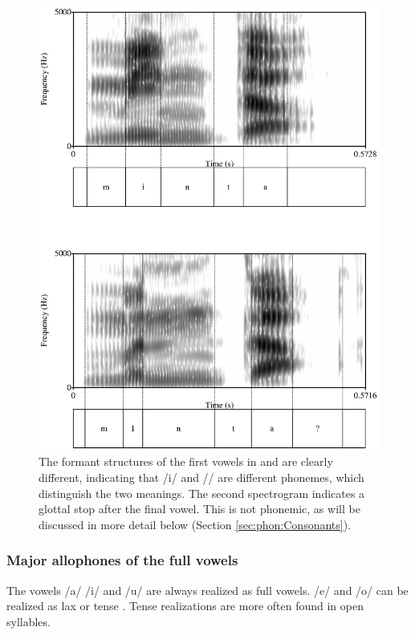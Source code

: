 \begin{figure}
 \centering
 \includegraphics[width=.8\textwidth]{pics/minthamEntha.eps}
\caption[Formant structures for  and ]{The formant structures of the first vowels in  and  are clearly different, indicating that /i/ and /\E/ are different phonemes, which distinguish the two meanings. The second spectrogram indicates a glottal stop after the final vowel. This is not phonemic, as will be discussed in more detail below (Section \ref{sec:phon:Consonants}). }
\label{fig:minthamEntha}
\end{figure}






\subsubsection{Major  allophones of the full vowels}\label{sec:phon:Majorallophonesofthefullvowels}
The vowels /a/ /i/ and /u/ are always realized as full vowels. /e/ and /o/ can be realized as lax   or tense . Tense realizations are more often found in open syllables.

